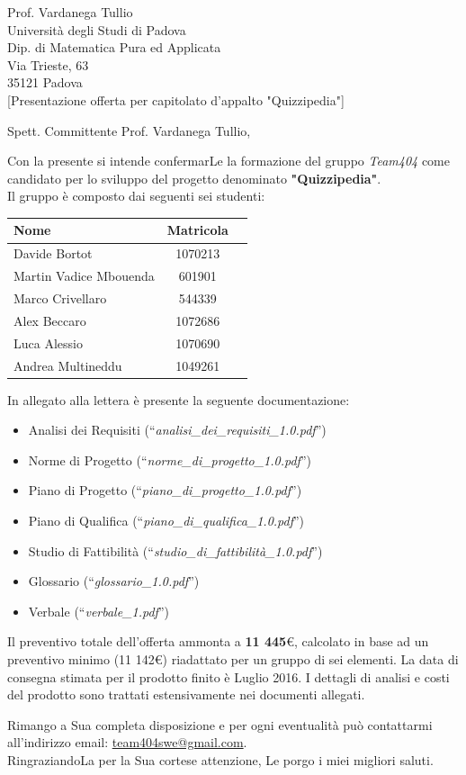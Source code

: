 \documentclass[boldsubject,shortindent,a4paper,11pt]{letteracdp}
\date{06 Aprile 2016}
\begin{document}
\begin{letter}{	Prof. Vardanega Tullio \\
				Universit\`a degli Studi di Padova \\
				Dip. di Matematica Pura ed Applicata \\
				Via Trieste, 63 \\
				35121 Padova\\
				}
[Presentazione offerta per capitolato d'appalto "Quizzipedia"]
\opening{Spett. Committente Prof. Vardanega Tullio,}
Con la presente si intende confermarLe la formazione del gruppo \emph{Team404} come candidato per lo sviluppo del progetto denominato \textbf{"Quizzipedia"}.
\\
Il gruppo è composto dai seguenti sei studenti:
		\begin{center}
			\begin{tabular}{l c l}
			\textbf{Nome} & \textbf{Matricola} \\
			\midrule
			Davide Bortot & 1070213 \\
			Martin Vadice Mbouenda & 601901\\
			Marco Crivellaro & 544339\\
			Alex Beccaro & 1072686\\
			Luca Alessio & 1070690\\
			Andrea Multineddu & 1049261\\
			\midrule
			\end{tabular}
		\end{center}
\noindent
In allegato alla lettera è presente la seguente documentazione:

\begin{itemize}
	\item Analisi dei Requisiti (``\textit{analisi\_dei\_requisiti\_1.0.pdf}'')
	\item Norme di Progetto (``\textit{norme\_di\_progetto\_1.0.pdf}'')
	\item Piano di Progetto (``\textit{piano\_di\_progetto\_1.0.pdf}'')
	\item Piano di Qualifica (``\textit{piano\_di\_qualifica\_1.0.pdf}'')
	\item Studio di Fattibilità (``\textit{studio\_di\_fattibilità\_1.0.pdf}'')
	\item Glossario (``\textit{glossario\_1.0.pdf}'')
	\item Verbale (``\textit{verbale\_1.pdf}'')
\end{itemize}

\noindent
Il preventivo totale dell'offerta ammonta a \textbf{11 445}\euro, calcolato in base ad un preventivo minimo (11 142\euro) riadattato per un gruppo di sei elementi.
\newpage
La data di consegna stimata per il prodotto finito è Luglio 2016. I dettagli di analisi e costi del prodotto sono trattati estensivamente nei documenti allegati.

\closing{Rimango a Sua completa disposizione e per ogni eventualit\`a pu\`o contattarmi all'indirizzo email: \url{team404swe@gmail.com}.\\RingraziandoLa per la Sua cortese attenzione, Le porgo i miei migliori saluti.}
\end{letter}
\end{document}
